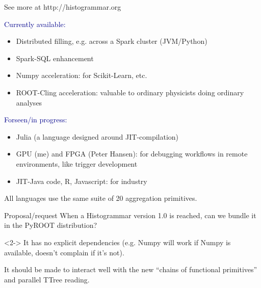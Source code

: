 \documentclass{beamer}
\begin{document}
\begin{frame}{See more at http://histogrammar.org}
\vspace{0.5 cm}

\textcolor{darkblue}{Currently available:}
\begin{itemize}
\item Distributed filling, e.g. across a Spark cluster (JVM/Python)
\item Spark-SQL enhancement
\item Numpy acceleration: for Scikit-Learn, etc.
\item ROOT-Cling acceleration: valuable to ordinary physicists doing ordinary analyses
\end{itemize}

\vfill
\textcolor{darkblue}{Forseen/in progress:}
\begin{itemize}
\item Julia (a language designed around JIT-compilation)
\item GPU (me) and FPGA (Peter Hansen): for debugging workflows in remote environments, like trigger development
\item JIT-Java code, R, Javascript: for industry
\end{itemize}

\vspace{0.25 cm}
All languages use the same suite of 20 aggregation primitives.
\end{frame}

\begin{frame}{Proposal/request}
When a Histogrammar version 1.0 is reached, can we bundle it in the PyROOT distribution?

\begin{uncoverenv}<2->
\vspace{0.5 cm}
It has no explicit dependencies (e.g. Numpy will work if Numpy is available, doesn't complain if it's not).

\vspace{0.5 cm}
It should be made to interact well with the new ``chains of functional primitives'' and parallel TTree reading.
\end{uncoverenv}
\end{frame}
\end{document}
